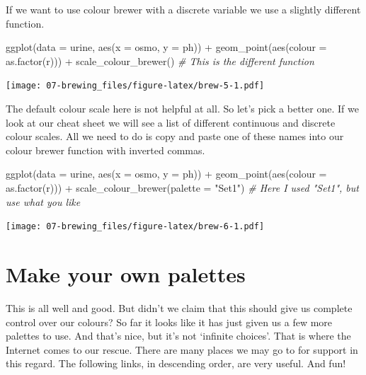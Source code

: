 \documentclass[
]{book}
\newenvironment{Shaded}{\begin{snugshade}}{\end{snugshade}}
\newcommand{\AttributeTok}[1]{\textcolor[rgb]{0.77,0.63,0.00}{#1}}
\newcommand{\CommentTok}[1]{\textcolor[rgb]{0.56,0.35,0.01}{\textit{#1}}}
\newcommand{\FunctionTok}[1]{\textcolor[rgb]{0.00,0.00,0.00}{#1}}
\newcommand{\NormalTok}[1]{#1}
\newcommand{\SpecialCharTok}[1]{\textcolor[rgb]{0.00,0.00,0.00}{#1}}
\newcommand{\StringTok}[1]{\textcolor[rgb]{0.31,0.60,0.02}{#1}}
\begin{document}
If we want to use colour brewer with a discrete variable we use a slightly different function.

\begin{Shaded}
\begin{Highlighting}[]
\FunctionTok{ggplot}\NormalTok{(}\AttributeTok{data =}\NormalTok{ urine, }\FunctionTok{aes}\NormalTok{(}\AttributeTok{x =}\NormalTok{ osmo, }\AttributeTok{y =}\NormalTok{ ph)) }\SpecialCharTok{+}
  \FunctionTok{geom\_point}\NormalTok{(}\FunctionTok{aes}\NormalTok{(}\AttributeTok{colour =} \FunctionTok{as.factor}\NormalTok{(r))) }\SpecialCharTok{+}
  \FunctionTok{scale\_colour\_brewer}\NormalTok{() }\CommentTok{\# This is the different function}
\end{Highlighting}
\end{Shaded}

\texttt{[image: 07-brewing\_files/figure-latex/brew-5-1.pdf]}

The default colour scale here is not helpful at all. So let's pick a better one. If we look at our cheat sheet we will see a list of different continuous and discrete colour scales. All we need to do is copy and paste one of these names into our colour brewer function with inverted commas.

\begin{Shaded}
\begin{Highlighting}[]
\FunctionTok{ggplot}\NormalTok{(}\AttributeTok{data =}\NormalTok{ urine, }\FunctionTok{aes}\NormalTok{(}\AttributeTok{x =}\NormalTok{ osmo, }\AttributeTok{y =}\NormalTok{ ph)) }\SpecialCharTok{+}
  \FunctionTok{geom\_point}\NormalTok{(}\FunctionTok{aes}\NormalTok{(}\AttributeTok{colour =} \FunctionTok{as.factor}\NormalTok{(r))) }\SpecialCharTok{+}
  \FunctionTok{scale\_colour\_brewer}\NormalTok{(}\AttributeTok{palette =} \StringTok{"Set1"}\NormalTok{) }\CommentTok{\# Here I used "Set1", but use what you like}
\end{Highlighting}
\end{Shaded}

\texttt{[image: 07-brewing\_files/figure-latex/brew-6-1.pdf]}

\hypertarget{make-your-own-palettes}{%
\section{Make your own palettes}\label{make-your-own-palettes}}

This is all well and good. But didn't we claim that this should give us complete control over our colours? So far it looks like it has just given us a few more palettes to use. And that's nice, but it's not `infinite choices'. That is where the Internet comes to our rescue. There are many places we may go to for support in this regard. The following links, in descending order, are very useful. And fun!
\end{document}
